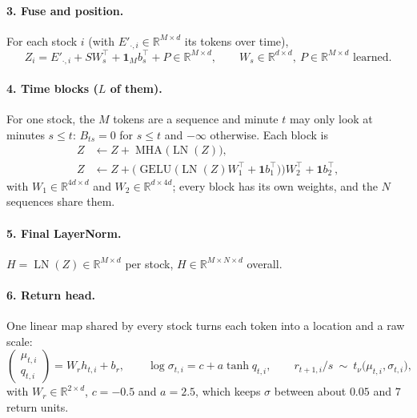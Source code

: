 \documentclass[11pt]{article}
\newcommand{\R}{\mathbb{R}}
\DeclareMathOperator{\LN}{LN}
\DeclareMathOperator{\MHA}{MHA}
\DeclareMathOperator{\GELU}{GELU}
\begin{document}
\paragraph{3. Fuse and position.} For each stock $i$ (with $E'_{\cdot,i}\in\R^{M\times d}$ its tokens over time),
\begin{equation}
  Z_i=E'_{\cdot,i}+SW_s^{\top}+\mathbf 1_Mb_s^{\top}+P\in\R^{M\times d},\qquad W_s\in\R^{d\times d},\ P\in\R^{M\times d}\text{ learned}.
\end{equation}

\paragraph{4. Time blocks ($L$ of them).} For one stock, the $M$ tokens are a sequence and minute $t$ may only look at minutes $s\le t$:
$B_{ts}=0$ for $s\le t$ and $-\infty$ otherwise. Each block is
\begin{align}
  Z&\leftarrow Z+\MHA\big(\LN(Z)\big),\\
  Z&\leftarrow Z+\Big(\GELU\big(\LN(Z)W_1^{\top}+\mathbf 1b_1^{\top}\big)\Big)W_2^{\top}+\mathbf 1b_2^{\top},
\end{align}
with $W_1\in\R^{4d\times d}$ and $W_2\in\R^{d\times 4d}$; every block has its own weights, and the $N$ sequences share them.

\paragraph{5. Final LayerNorm.} $H=\LN(Z)\in\R^{M\times d}$ per stock, $H\in\R^{M\times N\times d}$ overall.

\paragraph{6. Return head.} One linear map shared by every stock turns each token into a location and a raw scale:
\begin{equation}
  \begin{pmatrix}\mu_{t,i}\\ q_{t,i}\end{pmatrix}=W_rh_{t,i}+b_r,\qquad
  \log\sigma_{t,i}=c+a\tanh q_{t,i},\qquad r_{t+1,i}/s\ \sim\ t_\nu\big(\mu_{t,i},\sigma_{t,i}\big),
\end{equation}
with $W_r\in\R^{2\times d}$, $c=-0.5$ and $a=2.5$, which keeps $\sigma$ between about $0.05$ and $7$ return units.
\end{document}
